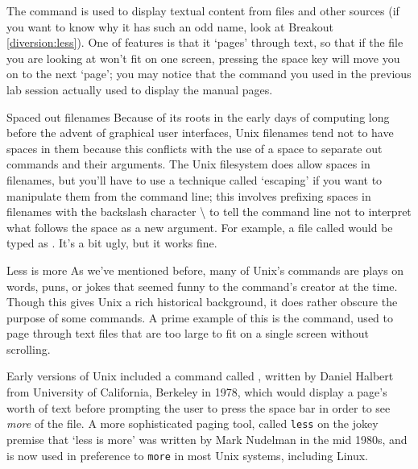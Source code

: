 
The  command is used to display textual content from files and other sources (if you want to know why it has such an odd name, look at Breakout \ref{diversion:less}). One of  features is that it `pages' through text, so that if the file you are looking at won't fit on one screen, pressing the space key will move you on to the next `page'; you may notice that the  command you used in the previous lab session actually used  to display the manual pages.

\begin{linux}{Spaced out filenames}
Because of its roots in the early days of computing long before the advent of graphical user interfaces, Unix filenames tend not to have spaces in them because this conflicts with the use of a space to separate out commands and their arguments. The Unix filesystem does allow spaces in filenames, but you'll have to use a technique called `escaping' if you want to manipulate them from the command line; this involves prefixing spaces in filenames with the backslash character \textbackslash{} to tell the command line not to interpret what follows the space as a new argument. For example, a file called  would be typed as . It's a bit ugly, but it works fine.
\end{linux}

\begin{diversion}{Less is more}
\label{diversion:less}
As we've mentioned before, many of Unix's commands are plays on words, puns, or jokes that seemed funny to the command's creator at the time. Though this gives Unix a rich historical background, it does rather obscure the purpose of some commands. A prime example of this is the  command, used to page through text files that are too large to fit on a single screen without scrolling.

Early versions of Unix included a command called , written by Daniel Halbert from University of California, Berkeley in 1978, which would display a page's worth of text before prompting the user to press the space bar in order to see \textit{more} of the file. A more sophisticated paging tool, called \texttt{less} on the jokey premise that `less is more' was written by Mark Nudelman in the mid 1980s, and is now used in preference to  \texttt{more} in most Unix systems, including Linux.
\end{diversion}

